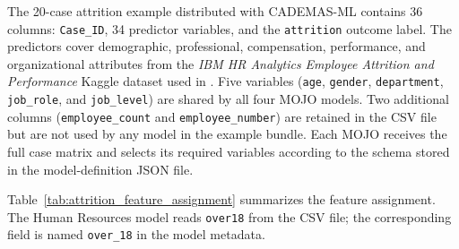 \documentclass[journal,article,submit,pdftex,moreauthors,mathematics]{Definitions/mdpi}
\begin{document}
The 20-case attrition example distributed with CADEMAS-ML contains 36 columns: \texttt{Case\_ID}, 34 predictor variables, and the \texttt{attrition} outcome label. The predictors cover demographic, professional, compensation, performance, and organizational attributes from the \textit{IBM HR Analytics Employee Attrition and Performance} Kaggle dataset used in \citet{Godz2026}. Five variables (\texttt{age}, \texttt{gender}, \texttt{department}, \texttt{job\_role}, and \texttt{job\_level}) are shared by all four MOJO models. Two additional columns (\texttt{employee\_count} and \texttt{employee\_number}) are retained in the CSV file but are not used by any model in the example bundle. Each MOJO receives the full case matrix and selects its required variables according to the schema stored in the model-definition JSON file.

Table~\ref{tab:attrition_feature_assignment} summarizes the feature assignment. The Human Resources model reads \texttt{over18} from the CSV file; the corresponding field is named \texttt{over\_18} in the model metadata.
\end{document}
